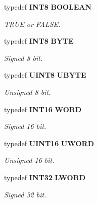 \begin{CompactItemize}
\item 
\label{asm/types.h_a0}
typedef {\bf INT8} {\bf BOOLEAN}
\begin{CompactList}\small\item\em TRUE or FALSE.\item\end{CompactList}

\item 
\label{asm/types.h_a1}
typedef {\bf INT8} {\bf BYTE}
\begin{CompactList}\small\item\em Signed 8 bit.\item\end{CompactList}

\item 
\label{asm/types.h_a2}
typedef {\bf UINT8} {\bf UBYTE}
\begin{CompactList}\small\item\em Unsigned 8 bit.\item\end{CompactList}

\item 
\label{asm/types.h_a3}
typedef {\bf INT16} {\bf WORD}
\begin{CompactList}\small\item\em Signed 16 bit.\item\end{CompactList}

\item 
\label{asm/types.h_a4}
typedef {\bf UINT16} {\bf UWORD}
\begin{CompactList}\small\item\em Unsigned 16 bit.\item\end{CompactList}

\item 
\label{asm/types.h_a5}
typedef {\bf INT32} {\bf LWORD}
\begin{CompactList}\small\item\em Signed 32 bit.\item\end{CompactList}


\end{CompactItemize}
